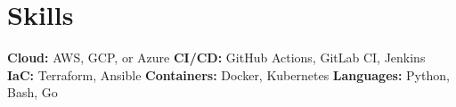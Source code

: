 \section{Skills}
\textbf{Cloud:} AWS, GCP, or Azure \quad
\textbf{CI/CD:} GitHub Actions, GitLab CI, Jenkins \quad
\textbf{IaC:} Terraform, Ansible \quad
\textbf{Containers:} Docker, Kubernetes \quad
\textbf{Languages:} Python, Bash, Go
